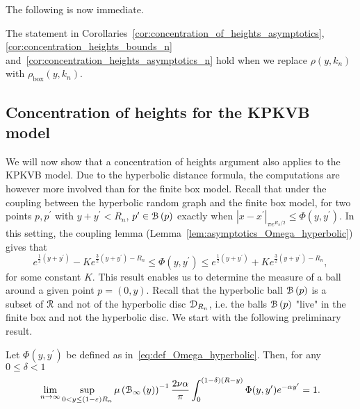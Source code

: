 The following is now immediate.

\begin{corollary}\label{cor:concentration_of_heights_Gbox}
The statement in Corollaries~\ref{cor:concentration_of_heights_asymptotics}, \ref{cor:concentration_heights_bounds_n}
and~\ref{cor:concentration_heights_asymptotics_n} hold when we replace $\rho(y,k_n)$ with $\rho_{\text{box}}(y,k_n)$.
\end{corollary}

\subsection{Concentration of heights for the KPKVB model}\label{ssec:average_degree_HP_n}


We will now show that a concentration of heights argument also applies to the KPKVB model. Due to the hyperbolic distance formula, the computations are however more involved than for the finite box model. Recall that under the coupling between the hyperbolic random graph and the finite box model, for two points $p, p^\prime$ with $y + y^\prime < R_n$, $p^\prime \in {\mathcal B}\left(p\right)$ exactly when $|x-x^\prime|_{\pi e^{R_n/2}} \le \Phi(y,y^\prime)$. In this setting, the coupling lemma (Lemma~\ref{lem:asymptotics_Omega_hyperbolic}) gives that  
\[
	e^{\frac{1}{2}(y+y^\prime)} - K e^{\frac{3}{2}(y+y^\prime) - R_n} \leq \Phi(y, y^\prime) 
		\leq  e^{\frac{1}{2}(y+y^\prime)} + K e^{\frac{3}{2}(y+y^\prime) - R_n},
\]
for some constant $K$. This result enables us to determine the measure of a ball around a given point $p=(0,y)$. Recall that the hyperbolic ball ${\mathcal B}\left(p\right)$ is a subset of ${\mathcal R}$ and not of the hyperbolic disc ${\mathcal D}_{R_n}$, i.e. the balls ${\mathcal B}\left(p\right)$ "live" in the finite box and not the hyperbolic disc. We start with the following preliminary result.

\begin{lemma}\label{lem:hyperbolic_ball_lower_part}
Let $\Phi(y,y^\prime)$ be defined as in~\eqref{eq:def_Omega_hyperbolic}. Then, for any $0 \le \delta < 1$
\[
	\lim_{n \to \infty} \sup_{0 < y \le (1-\varepsilon)R_n} \mu\left({\mathcal B}_{\infty}\left(y\right)\right)^{-1} \frac{2\nu \alpha}{\pi} \int_0^{(1-\delta)(R-y)} \Phi(y,y^\prime) e^{-\alpha y^\prime} = 1.
\]
\end{lemma}

